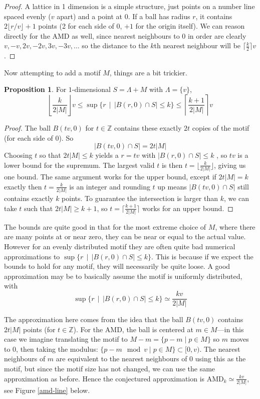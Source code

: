 \documentclass[11pt]{article}
\theoremstyle{definition}
\newtheorem{prop}{Proposition}
\begin{document}
\begin{proof}
A lattice in 1 dimension is a simple structure, just points on a number line spaced evenly ($v$ apart) and a point at $0$. If a ball has radius $r$, it contains $2\lfloor r/v\rfloor + 1$ points (2 for each side of 0, $+1$ for the origin itself). We can reason directly for the AMD as well, since nearest neighbours to 0 in order are clearly $v,-v,2v,-2v,3v,-3v,\dots$ so the distance to the $k$th nearest neighbour will be $\lceil\frac{k}{2}\rceil v$.
\end{proof}

Now attempting to add a motif $M$, things are a bit trickier.

\begin{prop} For $1$-dimensional $S = \Lambda + M$ with $\Lambda = \{v\}$, 
\[
\left\lfloor \frac{k}{2|M|} \right\rfloor v \leq \sup \{r \,\mid \, |B(r,0)\cap S| \leq k\} \leq   \left\lceil \frac{k+1}{2|M|} \right\rceil v
\]
\end{prop}
\begin{proof}
The ball $B(tv,0)$ for $t\in\mathbb{Z}$ contains these exactly $2t$ copies of the motif (for each side of 0). So
\[
|B(tv,0)\cap S| = 2t|M|
\]
Choosing $t$ so that $2t|M|\leq k$ yields a $r = tv$ with $|B(r,0)\cap S|\leq k$ , so $tv$ is a lower bound for the supremum. The largest valid $t$ is then $t = \lfloor \frac{k}{2|M|}\rfloor$, giving us one bound. The same argument works for the upper bound, except if $2t|M| = k$ exactly then $t = \frac{k}{2|M|}$ is an integer and rounding $t$ up means $|B(tv,0)\cap S|$ still contains exactly $k$ points. To guarantee the intersection is larger than $k$, we can take $t$ such that $2t|M| \geq k+1$, so $t = \lceil\frac{k+1}{2|M|}\rceil$ works for an upper bound.
\end{proof}

The bounds are quite good in that for the most extreme choice of $M$, where there are many points at or near zero, they can be near or equal to the actual value. However for an evenly distributed motif they are often quite bad numerical approximations to $\sup \{r \,\mid \, |B(r,0)\cap S| \leq k\}$. This is because if we expect the bounds to hold for any motif, they will necessarily be quite loose. A good approximation may be to basically assume the motif is uniformly distributed, with
\[
\sup \{r \,\mid \, |B(r,0)\cap S| \leq k\} \simeq \frac{kv}{2|M|}
\]

The approximation here comes from the idea that the ball $B(tv,0)$ contains $2t|M|$ points (for $t\in\mathbb{Z}$). For the AMD, the ball is centered at $m\in M$---in this case we imagine translating the motif to $M - m = \{p-m \mid p\in M\}$ so $m$ moves to $0$, then taking the modulus: $\{p-m \mod v \mid p\in M\}\subset [0,v)$. The nearest neighbours of $m$ are equivalent to the nearest neighbours of $0$ using this as the motif, but since the motif size has not changed, we can use the same approximation as before. Hence the conjectured approximation is AMD$_k \simeq \frac{kv}{2|M|}$, see Figure \ref{amd-line} below.
\end{document}

